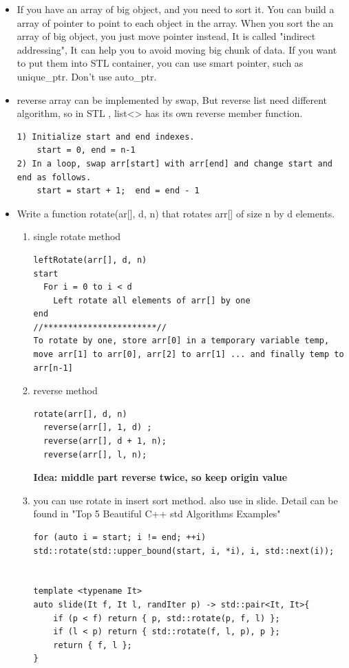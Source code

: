\documentclass[a4paper,12pt,twoside]{book}
\begin{document}
\begin{itemize}
\item If you have an array of big object, and you need to sort it. You can build a array of pointer to point to each object in the array. When you sort the an array of big object,  you just move pointer instead, It is called "indirect addressing", It can help you to avoid moving big chunk of data.  If you want to put them into STL container, you can use smart pointer, such as unique\_ptr. Don't use auto\_ptr. 

\item reverse array can be implemented by swap, But reverse list need different algorithm, so in STL , list<> has its own reverse member function. 
\begin{lstlisting}[breaklines]
1) Initialize start and end indexes. 
	start = 0, end = n-1
2) In a loop, swap arr[start] with arr[end] and change start and end as follows.
	start = start + 1;  end = end - 1
\end{lstlisting}

\item Write a function rotate(ar[], d, n) that rotates arr[] of size n by d elements.
\begin{enumerate}
\item single rotate method
\begin{lstlisting}[breaklines]
leftRotate(arr[], d, n)
start
  For i = 0 to i < d
    Left rotate all elements of arr[] by one
end
//***********************//
To rotate by one, store arr[0] in a temporary variable temp, move arr[1] to arr[0], arr[2] to arr[1] ... and finally temp to arr[n-1]
\end{lstlisting}
\item reverse method
\begin{lstlisting}[breaklines]
rotate(arr[], d, n)
  reverse(arr[], 1, d) ;
  reverse(arr[], d + 1, n);
  reverse(arr[], l, n);
\end{lstlisting}
\textbf{Idea: middle part reverse twice, so keep origin value}


\item you can use rotate in insert sort method. also use in slide. Detail can be found in "Top 5 Beautiful C++ std Algorithms Examples"
\begin{lstlisting}[breaklines]
for (auto i = start; i != end; ++i)
std::rotate(std::upper_bound(start, i, *i), i, std::next(i));


template <typename It> 
auto slide(It f, It l, randIter p) -> std::pair<It, It>{
	if (p < f) return { p, std::rotate(p, f, l) };
	if (l < p) return { std::rotate(f, l, p), p };
	return { f, l };
}
\end{lstlisting}



\end{enumerate}

\end{itemize}
\end{document}
